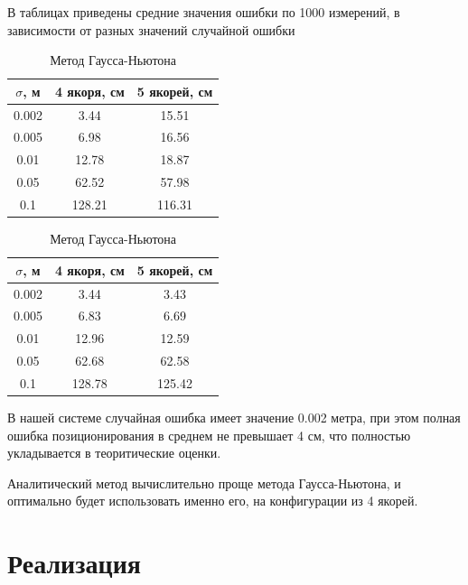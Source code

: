 \documentclass[a4paper,11pt]{article} %
\begin{document}
В таблицах приведены средние значения ошибки по 1000 измерений, в зависимости от разных значений случайной ошибки 
\begin{table}[h!]
  \centering
  \begin{minipage}{0.48\textwidth}
    \centering
    \caption{Аналитический метод}
    \begin{tabular}{|c|c|c|}
        \hline
        $\sigma$, м & 4 якоря, см & 5 якорей, см \\
        \hline
        0.002 & 3.44 & 15.51 \\
        \hline
        0.005 & 6.98 & 16.56 \\
        \hline
        0.01 & 12.78 & 18.87 \\
        \hline
        0.05 & 62.52 & 57.98 \\
        \hline
        0.1 & 128.21 & 116.31 \\
        \hline
    \end{tabular}
  \end{minipage}%
  \hspace{0.04\textwidth}%
  \begin{minipage}{0.48\textwidth}
    \centering
    \caption{Метод Гаусса-Ньютона}
    \begin{tabular}{|c|c|c|}
        \hline
        $\sigma$, м & 4 якоря, см & 5 якорей, см \\
        \hline
        0.002 & 3.44 & 3.43 \\
        \hline
        0.005 & 6.83 & 6.69 \\
        \hline
        0.01 & 12.96 & 12.59 \\
        \hline
        0.05 & 62.68 & 62.58 \\
        \hline
        0.1 & 128.78 & 125.42 \\
        \hline
    \end{tabular}
  \end{minipage}
\end{table}

В нашей системе случайная ошибка имеет значение 0.002 метра, при этом полная ошибка позиционирования
в среднем не превышает 4 см, что полностью укладывается в теоритические оценки.

Аналитический метод вычислительно проще метода Гаусса-Ньютона, и оптимально будет использовать именно его,
на конфигурации из 4 якорей.

\section{Реализация}
\end{document}
